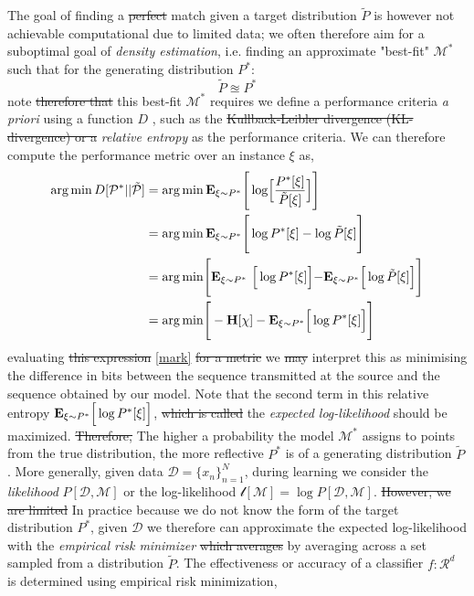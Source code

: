 \documentclass[7pt]{article}
\begin{document}
The goal of finding a \st{perfect} match given a target distribution ${\tilde{P}}$ is  however not achievable computational due to limited data; we often therefore aim for a suboptimal goal of \emph{density estimation}, i.e. finding an approximate "best-fit" ${\mathcal{M}^*}$ such that for the generating distribution ${P^*}$:
	\begin{equation}
	{\tilde{P}} \approxeq  {P^*} 
	\end{equation}
note \st{therefore that} this best-fit ${\mathcal{M}^*}$ requires  we define a performance criteria \emph{a priori} using a  function $D$ , such as the \st{Kullback-Leibler divergence (KL-divergence) or a} \emph{relative entropy} as the performance criteria. We can therefore compute the performance metric over an instance $\xi$ as,
	\begin{equation}
	\begin{split}
	\arg \min D[\mathcal{{P^*}}||\mathcal{\tilde{P}}] & = \arg \min \mathbf{E}_{\xi \sim P^*} \Biggr[ \log  \Bigr[ \dfrac{{P^*}[\xi]}{\tilde{P}[\xi]} \Bigr] \Biggl] \\
	& = \arg \min \mathbf{E}_{\xi \sim {P^*}}  \Biggr[ \log {P^*}[\xi] - \log \tilde{P}[\xi]   \Biggl] \\
	& = \arg \min \Biggr[  \mathbf{E}_{\xi \sim {P^*}} \ \Bigr[ \log {{P^*}}[\xi]  \Bigl] - \mathbf{E}_{\xi \sim {P^*}}  \Bigr[  \log \tilde{P}[\xi] \Bigl] \Biggr]  \\
	& = \arg \min  \Biggr[ - \mathbf{H}[\chi] - \mathbf{E}_{\xi \sim{P^*}}  \Bigr[  \log {P^*}[\xi] \Bigl]  \Biggl] 
	\end{split} 
	\label{mark}
	\end{equation}
evaluating \st{this expression} \eqref{mark} \st{for a metric} we \st{may} interpret this as minimising the difference in bits between the sequence transmitted at the source and the sequence obtained by our model. Note that the second term in this relative entropy $ \mathbf{E}_{\xi \sim {P^*}}  \Bigr[  \log {P^*}[\xi] \Bigl]$, \st{which is called} the \emph{expected log-likelihood} should be maximized. \st{Therefore,} The higher a probability the model ${\mathcal{M}^*}$ assigns to points  from the true distribution, the more reflective ${{P^*}}$ is of a generating distribution  ${\tilde{P}}$. More generally, given data $\mathcal{D} = \{x_n\}_{n=1}^N$, during learning we consider the \emph{likelihood} $P[\mathcal{D,M}]$ or the log-likelihood $ \mathcal{l} [\mathcal{M}] = \log P[\mathcal{D,M}] $.
\st{However, we are limited} In practice because we do not know the form of the target distribution $P^*$, given $\mathcal{D}$ we therefore can approximate the expected log-likelihood with the \emph{empirical risk minimizer} \st{which averages}  by averaging  across a set sampled from a distribution $\tilde{P}$. The effectiveness or accuracy of a classifier $f: \mathcal{R}^d$ is determined using {empirical risk minimization},
\end{document}
